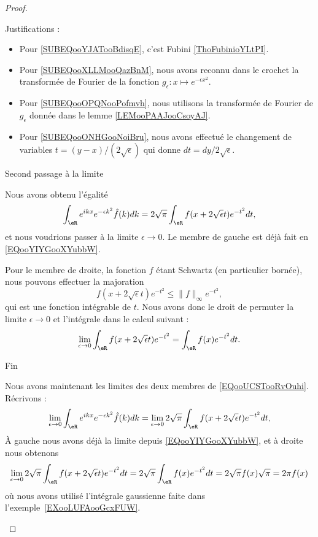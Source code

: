 \begin{proof}
\begin{subproof}
\begin{subproof}
			Justifications  :
			\begin{itemize}
				\item
				      Pour \eqref{SUBEQooYJATooBdisqE}, c'est Fubini \ref{ThoFubinioYLtPI}.
				\item
				      Pour \eqref{SUBEQooXLLMooQazBnM}, nous avons reconnu dans le crochet la transformée de Fourier de la fonction \( g_{\epsilon}\colon x\mapsto  e^{-\epsilon x^2}\).
				\item
				      Pour \eqref{SUBEQooOPQNooPofmvh}, nous utilisons la transformée de Fourier de \( g_{\epsilon}\) donnée dans le lemme \ref{LEMooPAAJooCsoyAJ}.
				\item
				      Pour \eqref{SUBEQooONHGooNoiBru}, nous avons effectué le changement de variables \( t=(y-x)/(2\sqrt{ \epsilon })\) qui donne \( dt=dy/2\sqrt{ \epsilon }\).
			\end{itemize}

		\end{subproof}

		\item[Second passage à la limite]

		Nous avons obtenu l'égalité
		\begin{equation}        \label{EQooUCSTooRvOuhi}
			\int_{\eR} e^{ikx} e^{-\epsilon k^2}\hat f(k)dk = 2\sqrt{ \pi }\int_{\eR}f(x+2\sqrt{ \epsilon }t) e^{-t^2}dt,
		\end{equation}
		et nous voudrions passer à la limite \( \epsilon\to 0\). Le membre de gauche est déjà fait en \eqref{EQooYIYGooXYubbW}.

		Pour le membre de droite, la fonction \( f\) étant Schwartz (en particulier bornée), nous pouvons effectuer la majoration
		\begin{equation}
			f(x+2\sqrt{ \epsilon }t) e^{-t^2}\leq \| f \|_{\infty} e^{-t^2},
		\end{equation}
		qui est une fonction intégrable de \( t\). Nous avons donc le droit de permuter la limite \( \epsilon\to 0\) et l'intégrale dans le calcul suivant :
		\begin{equation}
			\lim_{\epsilon\to 0}\int_{\eR}f(x+2\sqrt{ \epsilon }t) e^{-t^2}=\int_{\eR}f(x) e^{-t^2}dt.
		\end{equation}

		\item[Fin]

		Nous avons maintenant les limites des deux membres de \eqref{EQooUCSTooRvOuhi}. Récrivons :
		\begin{equation}
			\lim_{\epsilon\to 0}\int_{\eR} e^{ikx} e^{-\epsilon k^2}\hat f(k)dk =\lim_{\epsilon\to 0} 2\sqrt{ \pi }\int_{\eR}f(x+2\sqrt{ \epsilon }t) e^{-t^2}dt,
		\end{equation}
		À gauche nous avons déjà la limite depuis \eqref{EQooYIYGooXYubbW}, et à droite nous obtenons
		\begin{equation}
			\lim_{\epsilon\to 0} 2\sqrt{ \pi }\int_{\eR}f(x+2\sqrt{ \epsilon }t) e^{-t^2}dt=2\sqrt{ \pi }\int_{\eR}f(x) e^{-t^2}dt=2\sqrt{ \pi }f(x)\sqrt{ \pi }=2\pi f(x)
		\end{equation}
		où nous avons utilisé l'intégrale gaussienne faite dans l'exemple~\ref{EXooLUFAooGcxFUW}.


\end{subproof}
\end{proof}
